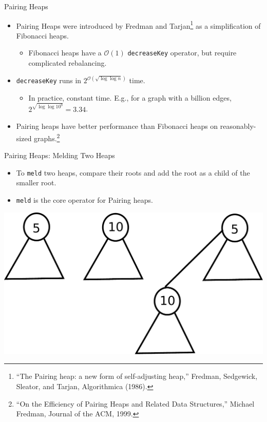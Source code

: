 \documentclass{beamer}
\begin{document}
\begin{frame}{Pairing Heaps}
  \begin{itemize}
    \item Pairing Heaps were introduced by Fredman and Tarjan\footnote{``The Pairing heap: a new form of self-adjusting heap,'' Fredman, Sedgewick, Sleator, and Tarjan, Algorithmica (1986).} as a simplification of Fibonacci heaps.
     \begin{itemize}
        \item Fibonacci heaps have a $\mathcal{O}(1)$ \texttt{decreaseKey} operator, but require complicated rebalancing.
      \end{itemize}
    \item \texttt{decreaseKey} runs in $2^{\mathcal{O}(\sqrt{\log \log n})}$ time.
        \begin{itemize}
          \item In practice, constant time. E.g., for a graph with a billion edges, $2^{\sqrt{\log \log 10^9}} = 3.34$.
        \end{itemize}
      \item Pairing heaps have better performance than Fibonacci heaps on reasonably-sized graphs.\footnote{``On the Efficiency of Pairing Heaps and Related Data Structures,'' Michael Fredman, Journal of the ACM, 1999.}
  \end{itemize}
\end{frame}

\begin{frame}{Pairing Heaps: Melding Two Heaps}
  \begin{itemize}
    \item To \texttt{meld} two heaps, compare their roots and add the root
      as a child of the smaller root.
    \item \texttt{meld} is the core operator for Pairing heaps.
  \end{itemize}
  \includegraphics[scale=0.30]{img/simpleMeld2.pdf}
\end{frame}
\end{document}
